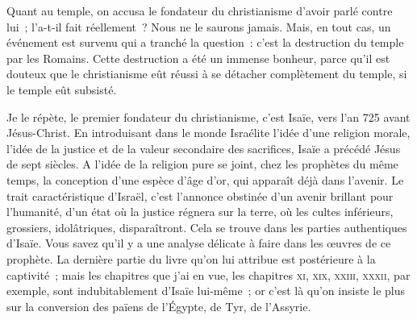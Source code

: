\documentclass[french,twoside]{book} %
\newcommand\orgName[1]{#1}
\newcommand\persName[1]{#1}
\newcommand\placeName[1]{#1}
\begin{document}
Quant au temple, on accusa le fondateur du christianisme d’avoir parlé contre lui ; l’a-t-il fait réellement ? Nous ne le saurons jamais. Mais, en tout cas, un événement est survenu qui a tranché la question : c’est la destruction du temple par les Romains. Cette destruction a été un immense bonheur, parce qu’il est douteux que le christianisme eût réussi à se détacher complètement du temple, si le temple eût subsisté.\par
Je le répète, le premier fondateur du {\orgName christianisme}, c’est {\persName Isaïe}, vers l’an 725 avant Jésus-Christ. En introduisant dans le {\orgName monde Israélite} l’idée d’une religion morale, l’idée de la justice et de la valeur secondaire des sacrifices, {\persName Isaïe} a précédé {\persName Jésus} de sept siècles. A l’idée de la religion pure se joint, chez les prophètes du même temps, la conception d’une espèce d’âge d’or, qui apparaît déjà dans l’avenir. Le trait caractéristique d’{\orgName Israël}, c’est l’annonce obstinée d’un avenir brillant pour l’humanité, d’un état où la justice régnera sur la terre, où les cultes inférieurs, grossiers, idolâtriques, disparaîtront. Cela se trouve dans les parties authentiques d’{\persName Isaïe}. Vous savez qu’il y a une analyse délicate à faire dans les œuvres de ce prophète. La dernière partie du livre qu’on lui attribue est postérieure à la captivité ; mais les chapitres que j’ai en vue, les chapitres \textsc{xi, xix, xxiii, xxxii}, par exemple, sont indubitablement d’{\persName Isaïe} lui-même ; or c’est là qu’on insiste le plus sur la conversion des païens de l’{\placeName Égypte}, de {\placeName Tyr}, de l’{\placeName Assyrie}.\par
\end{document}
